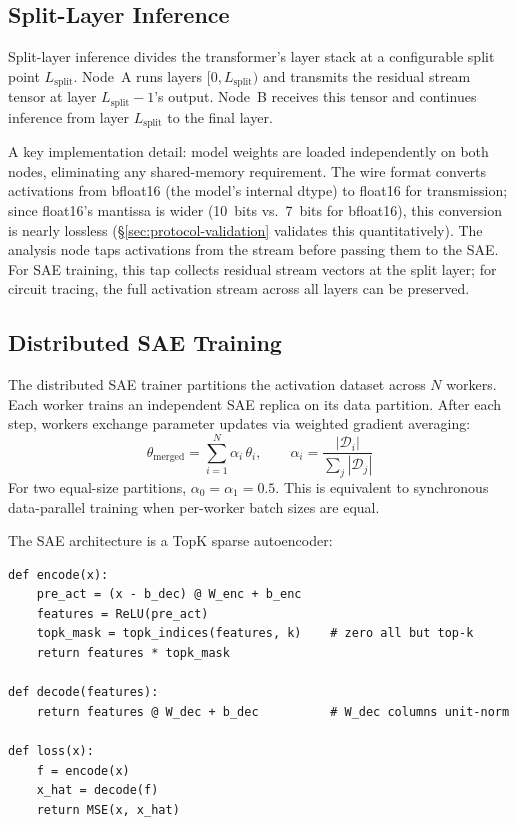 \documentclass[11pt]{article}
\begin{document}
\subsection{Split-Layer Inference}

Split-layer inference divides the transformer's layer stack at a configurable split point $L_{\mathrm{split}}$. Node~A runs layers $[0, L_{\mathrm{split}})$ and transmits the residual stream tensor at layer $L_{\mathrm{split}} - 1$'s output. Node~B receives this tensor and continues inference from layer $L_{\mathrm{split}}$ to the final layer.

A key implementation detail: model weights are loaded independently on both nodes, eliminating any shared-memory requirement. The wire format converts activations from bfloat16 (the model's internal dtype) to float16 for transmission; since float16's mantissa is wider (10~bits vs.\ 7~bits for bfloat16), this conversion is nearly lossless (\S\ref{sec:protocol-validation} validates this quantitatively). The analysis node taps activations from the stream before passing them to the SAE. For SAE training, this tap collects residual stream vectors at the split layer; for circuit tracing, the full activation stream across all layers can be preserved.

\subsection{Distributed SAE Training}
\label{sec:dist-training}

The distributed SAE trainer partitions the activation dataset across $N$ workers. Each worker trains an independent SAE replica on its data partition. After each step, workers exchange parameter updates via weighted gradient averaging:
\begin{equation}
  \theta_{\mathrm{merged}} = \sum_{i=1}^{N} \alpha_i\,\theta_i, \qquad \alpha_i = \frac{|\mathcal{D}_i|}{\sum_j |\mathcal{D}_j|}
\end{equation}
For two equal-size partitions, $\alpha_0 = \alpha_1 = 0.5$. This is equivalent to synchronous data-parallel training when per-worker batch sizes are equal.

The SAE architecture is a TopK sparse autoencoder:

\begin{lstlisting}[style=pycode, caption={SAE forward pass. Decoder weight columns are unit-normalized.}]
def encode(x):
    pre_act = (x - b_dec) @ W_enc + b_enc
    features = ReLU(pre_act)
    topk_mask = topk_indices(features, k)    # zero all but top-k
    return features * topk_mask

def decode(features):
    return features @ W_dec + b_dec          # W_dec columns unit-norm

def loss(x):
    f = encode(x)
    x_hat = decode(f)
    return MSE(x, x_hat)
\end{lstlisting}
\end{document}
